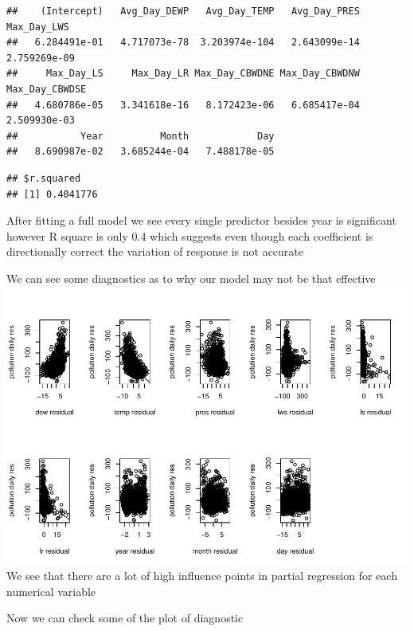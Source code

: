 \documentclass[
]{article}
\begin{document}
\begin{verbatim}
##    (Intercept)   Avg_Day_DEWP   Avg_Day_TEMP   Avg_Day_PRES    Max_Day_LWS 
##   6.284491e-01   4.717073e-78  3.203974e-104   2.643099e-14   2.759269e-09 
##     Max_Day_LS     Max_Day_LR Max_Day_CBWDNE Max_Day_CBWDNW Max_Day_CBWDSE 
##   4.680786e-05   3.341618e-16   8.172423e-06   6.685417e-04   2.509930e-03 
##           Year          Month            Day 
##   8.690987e-02   3.685244e-04   7.488178e-05
\end{verbatim}

\begin{verbatim}
## $r.squared
## [1] 0.4041776
\end{verbatim}

After fitting a full model we see every single predictor besides year is
significant however R square is only 0.4 which suggests even though each
coefficient is directionally correct the variation of response is not
accurate

We can see some diagnostics as to why our model may not be that
effective
\includegraphics{Final_Project_2_files/figure-latex/unnamed-chunk-8-1.pdf}
We see that there are a lot of high influence points in partial
regression for each numerical variable

Now we can check some of the plot of diagnostic
\end{document}
